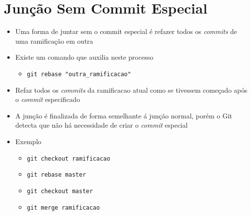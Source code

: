 \documentclass{beamer}
\newenvironment{slide}{\begin{frame}{\insertsection}}{\end{frame}}
\begin{document}
\section{Junção Sem Commit Especial}
\begin{slide}
    \begin{itemize}
        \item Uma forma de juntar sem o commit especial é refazer todos os
            \emph{commits} de uma ramificação em outra
        \pause
        \item Existe um comando que auxilia neste processo
        \begin{itemize}
            \pause
            \item \texttt{git rebase "outra\_ramificacao"}
        \end{itemize}
        \pause
        \item Refaz todos os \emph{commits} da ramificacao atual como se
            tivessem começado após o \emph{commit} especificado
        \pause
        \item A junção é finalizada de forma semelhante á junção normal, porém o
            Git detecta que não há necessidade de criar o \emph{commit} especial
        \pause
        \item Exemplo
        \begin{itemize}
            \pause
            \item \texttt{git checkout ramificacao}
            \pause
            \item \texttt{git rebase master}
            \pause
            \item \texttt{git checkout master}
            \pause
            \item \texttt{git merge ramificacao}
        \end{itemize}
    \end{itemize}
\end{slide}
\end{document}
